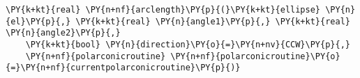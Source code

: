 \begin{Verbatim}[commandchars=\\\{\}]
    \PY{k+kt}{real} \PY{n+nf}{arclength}\PY{p}{(}\PY{k+kt}{ellipse} \PY{n}{el}\PY{p}{,} \PY{k+kt}{real} \PY{n}{angle1}\PY{p}{,} \PY{k+kt}{real} \PY{n}{angle2}\PY{p}{,}
    \PY{k+kt}{bool} \PY{n}{direction}\PY{o}{=}\PY{n+nv}{CCW}\PY{p}{,}
    \PY{n+nf}{polarconicroutine} \PY{n+nf}{polarconicroutine}\PY{o}{=}\PY{n+nf}{currentpolarconicroutine}\PY{p}{)}
\end{Verbatim}
